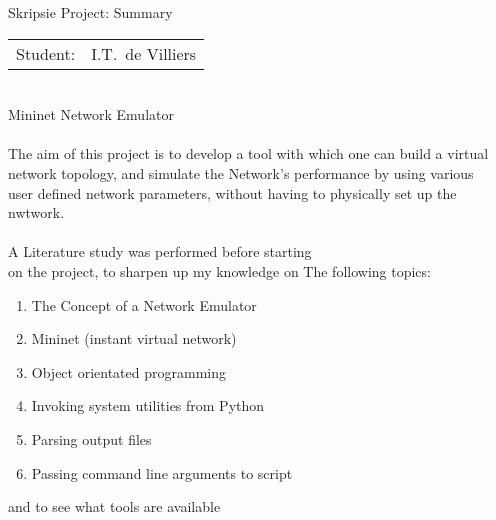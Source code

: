 
\begin{Summary}{Skripsie Project: Summary}

   \noindent
   \begin{tabular}{@{}ll@{}}
      \textsf{Student:}    &  I.T.\ de Villiers\\
   \end{tabular}

\begin{SumTable}
 \hline%
 \\
 \hline%
    Mininet Network Emulator\\
   

 \hline%
 \\
 \hline%
    The aim of this project is to develop a tool with which one can build a virtual\\
    network topology, and simulate the Network's performance by using various\\
    user defined network parameters, without having to physically set up the nwtwork.\\

 \hline%
 \\
 \hline%
    A Literature study was performed before starting\\
    on the project, to sharpen up my knowledge on The following topics:
	\begin{enumerate}
	\item The Concept of a Network Emulator
	\item Mininet (instant virtual network)
	\item Object orientated programming
	\item Invoking system utilities from Python
	\item Parsing output files
	\item Passing command line arguments to script
	\end{enumerate}
    and to see what tools are available\\


\end{SumTable}
\end{Summary}
